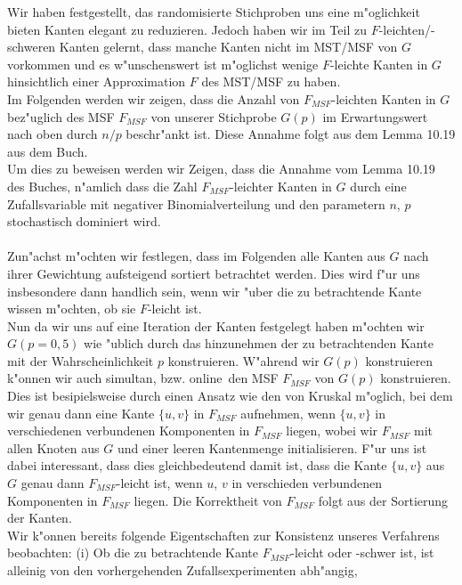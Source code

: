 Wir haben festgestellt, das randomisierte Stichproben uns eine m"oglichkeit 
    bieten Kanten elegant zu reduzieren.
    Jedoch haben wir im Teil zu $F$-leichten/-schweren Kanten gelernt, dass
    manche Kanten nicht im MST/MSF von $G$ vorkommen und es w"unschenswert
    ist m"oglichst wenige $F$-leichte Kanten in $G$ hinsichtlich einer 
    Approximation $F$ des MST/MSF zu haben.\\
Im Folgenden werden wir zeigen, dass die Anzahl von $F_{MSF}$-leichten Kanten in $G$ 
    bez"uglich des MSF $F_{MSF}$ von unserer Stichprobe $G(p)$ im Erwartungswert 
    nach oben durch $n/p$ beschr"ankt ist. 
    Diese Annahme folgt aus dem Lemma 10.19 aus dem Buch.\\
Um dies zu beweisen werden wir Zeigen, dass die Annahme vom Lemma 10.19 des
    Buches, n"amlich dass die Zahl $F_{MSF}$-leichter Kanten in $G$ durch
    eine Zufallsvariable mit negativer Binomialverteilung und den parametern
    $n$, $p$ stochastisch dominiert wird.\\
\\
Zun"achst m"ochten wir festlegen, dass im Folgenden alle Kanten aus $G$ nach 
    ihrer Gewichtung aufsteigend sortiert betrachtet werden.
    Dies wird f"ur uns insbesondere dann handlich sein, wenn wir "uber die zu 
    betrachtende Kante wissen m"ochten, ob sie $F$-leicht ist.\\
Nun da wir uns auf eine Iteration der Kanten festgelegt haben m"ochten wir 
    $G(p=0,5)$ wie "ublich durch das hinzunehmen der zu betrachtenden Kante mit
    der Wahrscheinlichkeit $p$ konstruieren.
    W"ahrend wir $G(p)$ konstruieren k"onnen wir auch simultan, bzw. 
    \glqq online\grqq\ den MSF $F_{MSF}$ von $G(p)$ konstruieren.
    Dies ist besipielsweise durch einen Ansatz wie den von Kruskal m"oglich, bei
    dem wir genau dann eine Kante $\{u,v\}$ in $F_{MSF}$ aufnehmen, wenn $\{u,v\}$
    in verschiedenen verbundenen Komponenten in $F_{MSF}$ liegen, wobei wir 
    $F_{MSF}$ mit allen Knoten aus $G$ und einer leeren Kantenmenge 
    initialisieren.
    F"ur uns ist dabei interessant, dass dies gleichbedeutend damit ist, dass die Kante 
    $\{u,v\}$
    aus $G$ genau dann $F_{MSF}$-leicht ist, wenn $u$, $v$ in verschieden 
    verbundenen Komponenten in $F_{MSF}$ liegen.
    Die Korrektheit von $F_{MSF}$ folgt aus der Sortierung der Kanten.\\
Wir k"onnen bereits folgende Eigentschaften zur Konsistenz unseres Verfahrens
    beobachten: 
    (i) Ob die zu betrachtende Kante $F_{MSF}$-leicht oder -schwer ist, 
    ist alleinig von den vorhergehenden Zufallsexperimenten abh"angig,

